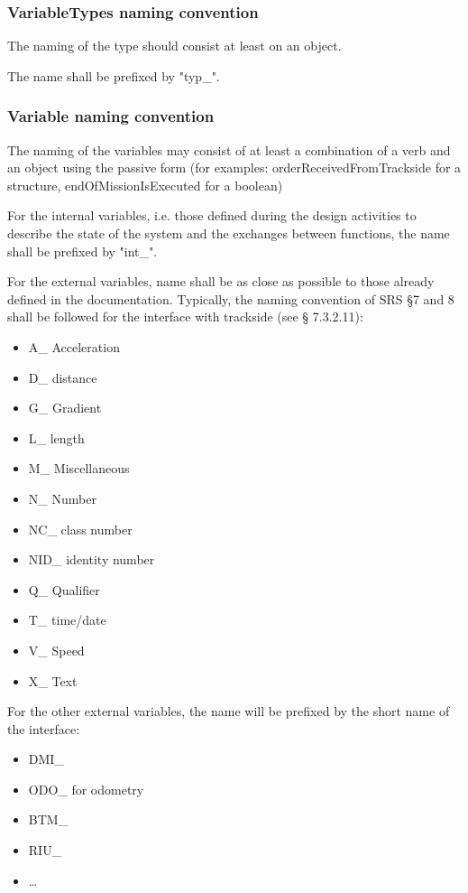 \subsubsection{VariableTypes naming convention}

The naming of the type should consist at least on an object.

The name shall be prefixed by "typ\_".

\subsubsection{Variable naming convention}

The naming of the variables may consist of at least a combination of a verb and an object using the passive form (for examples:   orderReceivedFromTrackside for a structure,     endOfMissionIsExecuted for a boolean)

For the internal variables, i.e. those defined during the design activities to describe the state of the system and the exchanges between functions, the name shall be prefixed by "int\_".

For the external variables, name shall be as close as possible to those already defined in the documentation.
Typically, the naming convention of SRS §7 and 8 shall be followed for the interface with trackside (see § 7.3.2.11):

\begin{itemize}
\item A\_ Acceleration
\item D\_ distance
\item G\_ Gradient
\item L\_ length
\item M\_ Miscellaneous
\item N\_ Number
\item NC\_ class number
\item NID\_ identity number
\item Q\_ Qualifier
\item T\_ time/date
\item V\_ Speed
\item X\_ Text
\end{itemize}

For the other external  variables, the name will be prefixed by the short name of the interface:

\begin{itemize}
\item DMI\_
\item ODO\_ for odometry
\item BTM\_
\item RIU\_
\item \dots
\end{itemize}

